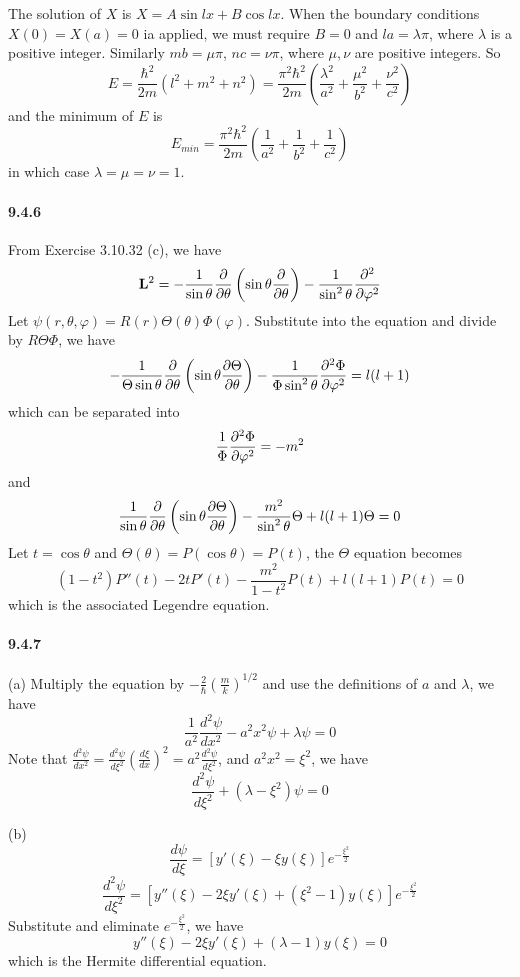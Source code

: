 \documentclass[a4paper]{article}
\begin{document}
The solution of $X$ is $X=A\sin lx+B\cos lx$. When the boundary conditions $X(0)=X(a)=0$ ia applied, we must require $B=0$ and $la=\lambda\pi$, where $\lambda$ is a positive integer. Similarly $mb=\mu\pi$, $nc=\nu\pi$, where $\mu,\nu$ are positive integers. So
\[
E=\frac{\hbar^2}{2m}(l^2+m^2+n^2)=\frac{\pi^2\hbar^2}{2m}\left(\frac{\lambda^2}{a^2}+\frac{\mu^2}{b^2}+\frac{\nu^2}{c^2}\right)
\]
and the minimum of $E$ is
\[
E_{min}=\frac{\pi^2\hbar^2}{2m}\left(\frac{1}{a^2}+\frac{1}{b^2}+\frac{1}{c^2}\right)
\]
in which case $\lambda=\mu=\nu=1$.
 
\paragraph{9.4.6}
From Exercise 3.10.32 (c), we have
\[
\mathbf{L}^2=-\frac{1}{\sin\theta}\frac{\partial}{\partial\theta}\left(\sin\theta\frac{\partial}{\partial\theta}\right)-\frac{1}{\sin^2\theta}\frac{\partial^2}{\partial\varphi^2}
\]
Let $\psi(r,\theta,\varphi)=R(r)\Theta(\theta)\Phi(\varphi)$. Substitute into the equation and divide by $R\Theta\Phi$, we have
\[
-\frac{1}{\Theta\sin\theta}\frac{\partial}{\partial\theta}\left(\sin\theta\frac{\partial\Theta}{\partial\theta} \right)-\frac{1}{\Phi\sin^2\theta}\frac{\partial^2\Phi}{\partial\varphi^2}=l(l+1)
\]
which can be separated into
\[
\frac{1}{\Phi}\frac{\partial^2\Phi}{\partial\varphi^2}=-m^2
\]
and
\[
\frac{1}{\sin\theta}\frac{\partial}{\partial\theta}\left(\sin\theta\frac{\partial\Theta}{\partial\theta} \right)-\frac{m^2}{\sin^2\theta}\Theta+l(l+1)\Theta=0
\]
Let $t=\cos\theta$ and $\Theta(\theta)=P(\cos\theta)=P(t)$, the $\Theta$ equation becomes
\[
(1-t^2)P''(t)-2tP'(t)-\frac{m^2}{1-t^2}P(t)+l(l+1)P(t)=0
\]
which is the associated Legendre equation. 

\paragraph{9.4.7}
(a) Multiply the equation by $-\frac{2}{\hbar}\left(\frac{m}{k} \right)^{1/2}$ and use the definitions of $a$ and $\lambda$, we have
\[
\frac{1}{a^2}\frac{d^2\psi}{dx^2}-a^2x^2\psi+\lambda\psi=0
\]
Note that $\frac{d^2\psi}{dx^2}=\frac{d^2\psi}{d\xi^2}\left(\frac{d\xi}{dx} \right)^2=a^2\frac{d^2\psi}{d\xi^2}$, and $a^2x^2=\xi^2$, we have
\[
\frac{d^2\psi}{d\xi^2}+(\lambda-\xi^2)\psi=0
\]

(b) 
\[
\frac{d\psi}{d\xi}=\left[y'(\xi)-\xi y(\xi) \right]e^{-\frac{\xi^2}{2}}
\]
\[
\frac{d^2\psi}{d\xi^2}=\left[y''(\xi)-2\xi y'(\xi)+(\xi^2-1)y(\xi) \right]e^{-\frac{\xi^2}{2}}
\]
Substitute and eliminate $e^{-\frac{\xi^2}{2}}$, we have
\[
y''(\xi)-2\xi y'(\xi)+(\lambda-1)y(\xi)=0
\]
which is the Hermite differential equation.
\end{document}
